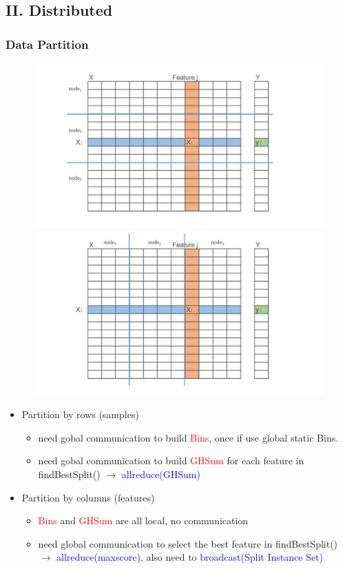 \documentclass{beamer}
\begin{document}
\subsection{II. Distributed} 
\begin{frame}
	\frametitle{Data Partition}
		\begin{figure}
			\includegraphics[width=.5\linewidth]{figs/datapartition1.jpg}
			\includegraphics[width=.5\linewidth]{figs/datapartition2.jpg}
		\end{figure}
		

		\begin{itemize}
			\item Partition by rows (samples) 
			\begin{itemize}			
				\item need gobal communication to build \textcolor{red}{Bins}, once if use global static Bins.
				\item need gobal communication to build \textcolor{red}{GHSum} for each feature in findBestSplit() $\rightarrow$ \textcolor{blue}{allreduce(GHSum)}
			\end{itemize}			
			\item Partition by columns (features)
			\begin{itemize}			
				\item \textcolor{red}{Bins} and \textcolor{red}{GHSum} are all local, no communication
				\item need global communication to select the best feature in findBestSplit() $\rightarrow$ \textcolor{blue}{allreduce(maxscore)}, also need to  \textcolor{blue}{broadcast(Split Instance Set)}
			\end{itemize}			
			
		\end{itemize}
	
\end{frame}
\end{document}
